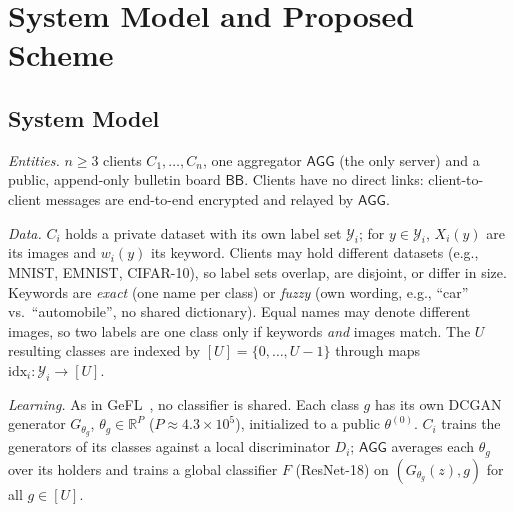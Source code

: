 \providecommand{\Agg}{\mathsf{AGG}}
\providecommand{\BB}{\mathsf{BB}}
\providecommand{\SecAgg}{\mathsf{SecAgg}}
\providecommand{\Seal}{\mathsf{Seal}}
\providecommand{\Open}{\mathsf{Open}}
\providecommand{\Fgrp}{\mathcal{F}_{\mathsf{grp}}}
\providecommand{\sample}{\xleftarrow{\$}}
\providecommand{\pp}{\mathsf{pp}}
\algrenewcommand{}
\algrenewcommand{}

\section{System Model and Proposed Scheme}
\label{sec:system}

\subsection{System Model}
\label{sec:model}

\emph{Entities.} $n\ge3$ clients $C_1,\dots,C_n$, one aggregator $\Agg$ (the only server) and a
public, append-only bulletin board $\BB$. Clients have no direct links: client-to-client messages
are end-to-end encrypted and relayed by $\Agg$.

\emph{Data.} $C_i$ holds a private dataset with its own label set $\mathcal{Y}_i$; for
$y\in\mathcal{Y}_i$, $X_i(y)$ are its images and $w_i(y)$ its keyword. Clients may hold different
datasets (e.g., MNIST, EMNIST, CIFAR-10), so label sets overlap, are disjoint, or differ in size.
Keywords are \emph{exact} (one name per class) or \emph{fuzzy} (own wording, e.g., ``car'' vs.\
``automobile'', no shared dictionary). Equal names may denote different images, so two labels are
one class only if keywords \emph{and} images match. The $U$ resulting classes are indexed by
$[U]=\{0,\dots,U-1\}$ through maps $\mathrm{idx}_i:\mathcal{Y}_i\to[U]$.

\emph{Learning.} As in GeFL~\cite{gefl}, no classifier is shared. Each class $g$ has its own DCGAN
generator $G_{\theta_g}$, $\theta_g\in\mathbb{R}^P$ ($P\approx4.3\times10^5$), initialized to a public
$\theta^{(0)}$. $C_i$ trains the generators of its classes against a local discriminator $D_i$;
$\Agg$ averages each $\theta_g$ over its holders and trains a global classifier $F$ (ResNet-18) on
$(G_{\theta_g}(z),g)$ for all $g\in[U]$.


